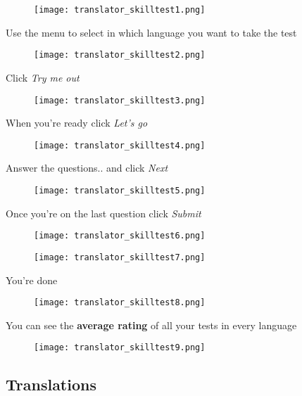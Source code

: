 \documentclass[11 pt, a4paper]{article}
\begin{document}
\begin{figure}[H]
\centering
\texttt{[image: translator\_skilltest1.png]}
\end{figure}


\clearpage
Use the menu to select in which language you want to take the test
\begin{figure}[H]
\centering
\texttt{[image: translator\_skilltest2.png]}
\end{figure}

Click \textit{Try me out}
\begin{figure}[H]
\centering
\texttt{[image: translator\_skilltest3.png]}
\end{figure}


\clearpage
When you're ready click \textit{Let's go}
\begin{figure}[H]
\centering
\texttt{[image: translator\_skilltest4.png]}
\end{figure}

Answer the questions.. and click \textit{Next}
\begin{figure}[H]
\centering
\texttt{[image: translator\_skilltest5.png]}
\end{figure}


\clearpage
Once you're on the last question click \textit{Submit}
\begin{figure}[H]
\centering
\texttt{[image: translator\_skilltest6.png]}
\end{figure}


\begin{figure}[H]
\centering
\texttt{[image: translator\_skilltest7.png]}
\end{figure}


\clearpage
You're done
\begin{figure}[H]
\centering
\texttt{[image: translator\_skilltest8.png]}
\end{figure}

You can see the \textbf{average rating} of all your tests in every language
\begin{figure}[H]
\centering
\texttt{[image: translator\_skilltest9.png]}
\end{figure}

\clearpage
\subsection{Translations}
\end{document}
